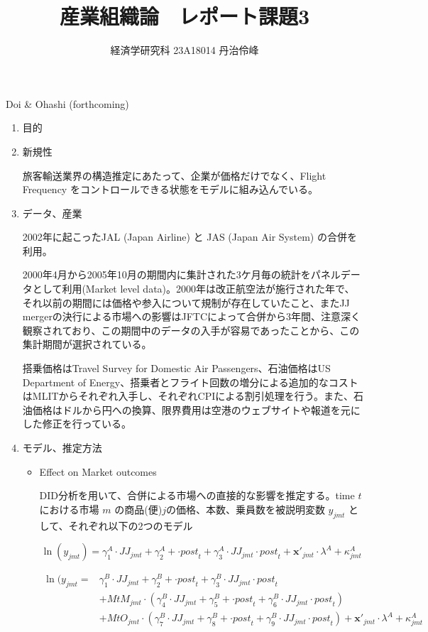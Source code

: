 \documentclass{jsarticle}
\begin{document}
\title{産業組織論　レポート課題3}
\author{経済学研究科 23A18014 丹治伶峰}
\date{}
\maketitle

Doi \& Ohashi (forthcoming)

\begin{enumerate}

\item 目的

\item 新規性

旅客輸送業界の構造推定にあたって、企業が価格だけでなく、Flight Frequency をコントロールできる状態をモデルに組み込んでいる。

\item データ、産業

2002年に起こったJAL (Japan Airline) と JAS (Japan Air System) の合併を利用。

2000年4月から2005年10月の期間内に集計された3ケ月毎の統計をパネルデータとして利用(Market level data)。2000年は改正航空法が施行された年で、それ以前の期間には価格や参入について規制が存在していたこと、またJJ mergerの決行による市場への影響はJFTCによって合併から3年間、注意深く観察されており、この期間中のデータの入手が容易であったことから、この集計期間が選択されている。

搭乗価格はTravel Survey for Domestic Air Passengers、石油価格はUS Department of Energy、搭乗者とフライト回数の増分による追加的なコストはMLITからそれぞれ入手し、それぞれCPIによる割引処理を行う。また、石油価格はドルから円への換算、限界費用は空港のウェブサイトや報道を元にした修正を行っている。

\item モデル、推定方法

\begin{itemize}

\item Effect on Market outcomes

DID分析を用いて、合併による市場への直接的な影響を推定する。time $t$における市場 $m$ の商品(便)$j$の価格、本数、乗員数を被説明変数 $y_{jmt}$ として、それぞれ以下の2つのモデル

\[\ln(y_{jmt})=\gamma^A_1 \cdot \textit{JJ}_{jmt} + \gamma^A_2 + \cdot \textit{post}_t +\gamma_3^A \cdot \textit{JJ}_{jmt} \cdot \textit{post}_t + \mathbf{x}'_{jmt} \cdot \lambda^A +\kappa_{jmt}^A \]

\begin{align*}
\ln(y_{jmt}= &\gamma^B_1 \cdot \textit{JJ}_{jmt} + \gamma^B_2 + \cdot \textit{post}_t +\gamma_3^B \cdot \textit{JJ}_{jmt} \cdot \textit{post}_t \\
 & + \textit{MtM}_{jmt} \cdot (\gamma^B_4 \cdot \textit{JJ}_{jmt} + \gamma^B_5 + \cdot \textit{post}_t +\gamma_6^B \cdot \textit{JJ}_{jmt} \cdot \textit{post}_t ) \\
 & +\textit{MtO}_{jmt} \cdot (\gamma^B_7 \cdot \textit{JJ}_{jmt} + \gamma^B_8 + \cdot \textit{post}_t +\gamma_9^B \cdot \textit{JJ}_{jmt} \cdot \textit{post}_t) + \mathbf{x}'_{jmt} \cdot \lambda^A +\kappa_{jmt}^A 
 \end{align*}


\end{itemize}
\end{enumerate}
\end{document}

